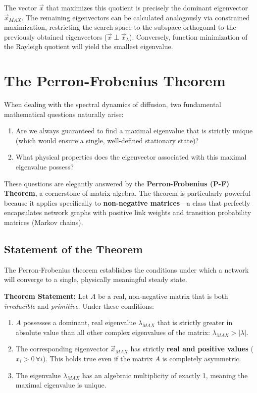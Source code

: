 The vector $\vec{x}$ that maximizes this quotient is precisely the dominant eigenvector $\vec{x}_{MAX}$. The remaining eigenvectors can be calculated analogously via constrained maximization, restricting the search space to the subspace orthogonal to the previously obtained eigenvectors ($\vec{x} \perp \vec{x}_\lambda$). Conversely, function minimization of the Rayleigh quotient will yield the smallest eigenvalue.

\section{The Perron-Frobenius Theorem}

When dealing with the spectral dynamics of diffusion, two fundamental mathematical questions naturally arise:
\begin{enumerate}
    \item Are we always guaranteed to find a maximal eigenvalue that is strictly unique (which would ensure a single, well-defined stationary state)?
    \item What physical properties does the eigenvector associated with this maximal eigenvalue possess?
\end{enumerate}

These questions are elegantly answered by the \textbf{Perron-Frobenius (P-F) Theorem}, a cornerstone of matrix algebra. The theorem is particularly powerful because it applies specifically to \textbf{non-negative matrices}—a class that perfectly encapsulates network graphs with positive link weights and transition probability matrices (Markov chains).

\subsection{Statement of the Theorem}

The Perron-Frobenius theorem establishes the conditions under which a network will converge to a single, physically meaningful steady state.

\textbf{Theorem Statement:} Let $A$ be a real, non-negative matrix that is both \textit{irreducible} and \textit{primitive}. Under these conditions:
\begin{enumerate}
    \item $A$ possesses a dominant, real eigenvalue $\lambda_{MAX}$ that is strictly greater in absolute value than all other complex eigenvalues of the matrix: $\lambda_{MAX} > |\lambda|$.
    \item The corresponding eigenvector $\vec{x}_{MAX}$ has strictly \textbf{real and positive values} ($x_i > 0 \, \forall i$). This holds true even if the matrix $A$ is completely asymmetric.
    \item The eigenvalue $\lambda_{MAX}$ has an algebraic multiplicity of exactly 1, meaning the maximal eigenvalue is unique.
\end{enumerate}

